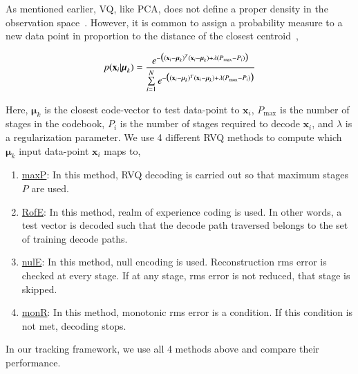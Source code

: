 %
%



As mentioned earlier, VQ, like PCA, does not define a proper density in the observation space~\cite{1999_JNL_Gaussian_roweis}.  However, it is common to assign a probability measure to a new data point in proportion to the distance of the closest centroid~\cite{1999_JNL_Gaussian_roweis},

\begin{equation}
p(\mathbf{x}_i|\boldsymbol\mu_k) = \frac{e^{-\big((\mathbf{x}_i-\boldsymbol\mu_k)^T(\mathbf{x}_i-\boldsymbol\mu_k) + \lambda({P_{\textrm{max}}-P_i})\big)}} {\sum\limits_{i=1}^N e^{-\big((\mathbf{x}_i-\boldsymbol\mu_k)^T(\mathbf{x}_i-\boldsymbol\mu_k) + \lambda({P_{\textrm{max}}-P_i})\big)}}
\end{equation}

Here, $\boldsymbol\mu_k$ is the closest code-vector to test data-point to $\mathbf{x}_i$,  $P_{\textrm{max}}$ is the number of stages in the codebook, $P_i$ is the number of stages required to decode $\mathbf{x}_i$, and $\lambda$ is a regularization parameter.  We use 4 different RVQ methods to compute which $\boldsymbol \mu_k$ input data-point $\mathbf{x}_i$ maps to,

\begin{enumerate}
\item \underline{maxP}: In this method, RVQ decoding is carried out so that maximum stages $P$ are used.
\item \underline{RofE}: In this method, realm of experience coding is used.  In other words, a test vector is decoded such that the decode path traversed belongs to the set of training decode paths.
\item \underline{nulE}: In this method, null encoding is used.  Reconstruction rms error is checked at every stage.  If at any stage, rms error is not reduced, that stage is skipped.
\item \underline{monR}: In this method, monotonic rms error is a condition.  If this condition is not met, decoding stops.
\end{enumerate}

In our tracking framework, we use all 4 methods above and compare their performance. 


